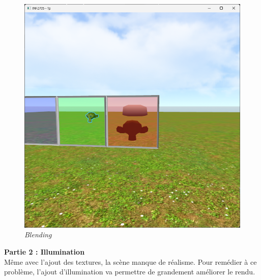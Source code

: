 \documentclass{article}[letterpaper, 11pt]
\begin{document}
\begin{figure}[h]
		 \centering
		 \includegraphics[scale = 0.30]{image_3.png}

		 \caption{ \centering \textit{Blending}}
\end{figure}

\newpage
\textbf{Partie 2 : Illumination}\vspace{11pt}
\\
Même avec l'ajout des textures, la scène manque de réalisme. Pour remédier à ce problème, l'ajout
d'illumination va permettre de grandement améliorer le rendu.
\end{document}
